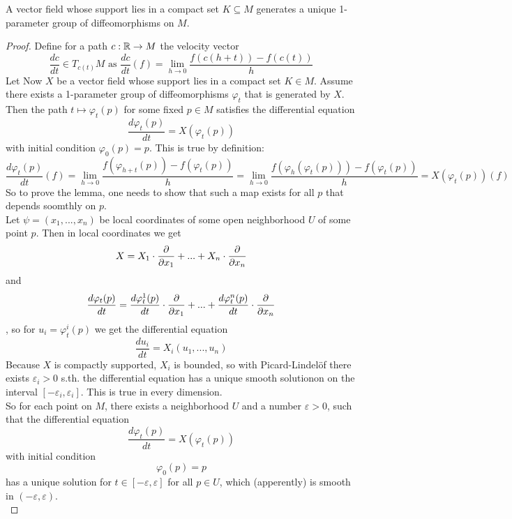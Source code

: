 \documentclass[a4paper,11pt]{article}
\begin{document}
\begin{lemma}
   \label{lemma:vector fields generate 1-parameter groups}
   A vector field whose support lies in a compact set $K \subseteq M$ generates 
   a unique 1-parameter group of diffeomorphisms on $M$.
\end{lemma}

\begin{proof}
   Define for a path $c: {\mathbb R} \rightarrow M$ the velocity vector 
   \[ \frac{dc}{dt} \in T_{c(t)}M \text{ as } \frac{dc}{dt}(f) = 
   \lim_{h \to 0} \frac{f(c(h + t)) - f(c(t))}{h}\]
   Let Now $X$ be a vector field whose support lies in a compact set $K \in M$. 
   Assume there exists a 1-parameter group of diffeomorphisms $\varphi_t$ that 
   is generated by $X$. Then the path $t \mapsto \varphi_t(p)$ for some fixed 
   $p \in M$ satisfies the differential equation
   \[ \frac{d\varphi_t(p)}{dt} = X(\varphi_t(p)) \]
   with initial condition $\varphi_0(p) = p$. This is true by definition:
   \[ \frac{d\varphi_t(p)}{dt}(f) 
   = \lim_{h \to 0} \frac{f(\varphi_{h + t}(p)) - f(\varphi_t(p))}{h} 
   = \lim_{h \to 0} \frac{f(\varphi_{h}(\varphi_t(p))) - f(\varphi_t(p))}{h} 
   = X(\varphi_t(p))(f) \]
   So to prove the lemma, one needs to show that such a map exists for all $p$ 
   that depends soomthly on $p$. \\
   Let $\psi = (x_1, ..., x_n)$ be local coordinates of some open neighborhood 
   $U$ of some point $p$. Then in local coordinates we get
   \[ X = X_1 \cdot \frac{\partial  }{\partial x_1} + ... + X_n \cdot \frac{\partial  }{\partial x_n} \]
   and 
   \[ \frac{d\varphi_t(p)}{dt} 
   = \frac{d\varphi_t^1(p)}{dt} \cdot \frac{\partial  }{\partial x_1} + ... + \frac{d\varphi_t^n(p)}{dt} \cdot \frac{\partial  }{\partial x_n}\]
   , so for $u_i = \varphi_t^i(p)$ we get the differential equation 
   \[ \frac{du_i}{dt} = X_i(u_1, ..., u_n) \]
   Because $X$ is compactly supported, $X_i$ is bounded, so with
   Picard-Lindelöf there exists $\varepsilon_i > 0$ s.th. the differential equation
   has a unique smooth solutionon on the interval $[-\varepsilon_i, \varepsilon_i]$. 
   This is true in every dimension. \\
   So for each point on $M$, there exists a neighborhood $U$ and a number 
   $\varepsilon > 0$, such that the differential equation
   \[ \frac{d\varphi_t(p)}{dt} = X(\varphi_t(p)) \]
   with initial condition 
   \[ \varphi_0(p) = p \]
   has a unique solution for $t \in [-\varepsilon, \varepsilon]$ for all 
   $p \in U$, which (apperently) is smooth in $(-\varepsilon, \varepsilon)$. \\

\end{proof}
\end{document}

